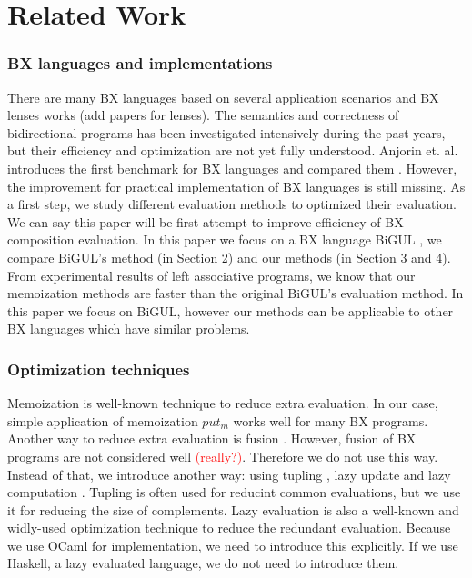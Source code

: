 \section{Related Work}

\subsubsection*{BX languages and implementations}

There are many BX languages \cite{josh_pepm} \cite{BXtend} \cite{eMoflon} \cite{EVL+Strace} \cite{JTL} \cite{NMF}
based on several application scenarios and BX lenses works \cite{} (add papers for lenses). The semantics and correctness of bidirectional programs has been investigated intensively during the past years, but their efficiency and optimization are not yet fully understood. Anjorin et. al. introduces the first benchmark for BX languages and compared them \cite{BXcomp}. However, the improvement for practical implementation of BX languages is still missing. As a first step, we study different evaluation methods to optimized their evaluation. We can say this paper will be first attempt to improve efficiency of BX composition evaluation. In this paper we focus on a BX language BiGUL \cite{josh_pepm} \cite{josh_popl}, we compare BiGUL's method (in Section 2) and our methods (in Section 3 and 4). From experimental results of left associative programs, we know that our memoization methods are faster than the original BiGUL's evaluation method.
In this paper we focus on BiGUL, however our methods can be applicable to other BX languages which have similar problems.


\subsubsection*{Optimization techniques}

Memoization \cite{} is well-known technique to reduce extra evaluation. In our case, simple application of memoization $put_m$ works well for many BX programs.
Another way to reduce extra evaluation is fusion \cite{}. However, fusion of BX programs are not considered well \textcolor{red}{(really?)}. Therefore we do not use this way.
  Instead of that, we introduce another way: using tupling \cite{}, lazy update and lazy computation \cite{}. Tupling \cite{tupling} is often used for reducint common evaluations, but we use it for reducing the size of complements.
  Lazy evaluation \cite{} is also a well-known and widly-used optimization technique to reduce the redundant evaluation. Because we use OCaml for implementation, we need to introduce this explicitly. If we use Haskell, a lazy evaluated language, we do not need to introduce them.


